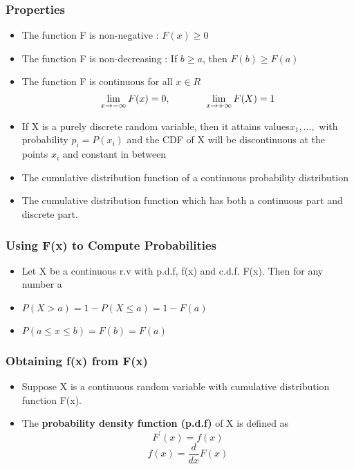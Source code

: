 \documentclass{article}
\begin{document}
\subsubsection{Properties}
\begin{itemize}
\item The function F is non-negative : \(F(x) \geq  0 \) 
\item The function F is non-decreasing : If \(b \geq a\), then \(F(b) \geq F(a)\)
\item The function F is continuous for all \(x \in R\)
$$ \lim_{x \to -\infty} F(x) = 0, \hspace{1.3cm} \lim_{x \to +\infty} F(X) = 1 $$
\end{itemize}

\begin{itemize}
\item If X is a purely discrete random variable,
then it attains values\(x_1, \ldots, \) with probability \(p_i = P(x_i)\) and the CDF of X will be discontinuous at the points \(x_i\) and constant in between 
\item The cumulative distribution function of a continuous probability distribution 
\item The cumulative distribution function which has both a continuous part and discrete part. 
\end{itemize}

\subsubsection{Using F(x) to Compute Probabilities}
\begin{itemize}
\item Let X be a continuous r.v with p.d.f, f(x) and c.d.f. F(x). Then for any number a 
\item \(P(X > a) = 1 - P(X \leq a) = 1 - F(a) \)
\item \(P(a \leq x \leq b) = F(b) = F(a) \)
\end{itemize}

\subsubsection{Obtaining f(x) from F(x)}
\begin{itemize}
\item Suppose X is a continuous random variable with cumulative
distribution function F(x).
\item The \textbf{probability density function (p.d.f)} of X is defined as
$$F^\prime(x) = f(x)$$
$$f(x) = \frac{d}{dx} F(x) $$
\end{itemize}
\end{document}

